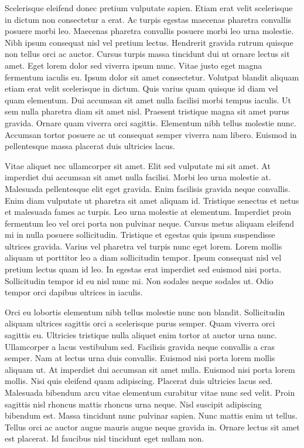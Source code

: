 \documentclass[11pt,a4paper]{article}
\begin{document}
Scelerisque eleifend donec pretium vulputate sapien. Etiam erat velit scelerisque in dictum non consectetur a erat. Ac turpis egestas maecenas pharetra convallis posuere morbi leo. Maecenas pharetra convallis posuere morbi leo urna molestie. Nibh ipsum consequat nisl vel pretium lectus. Hendrerit gravida rutrum quisque non tellus orci ac auctor. Cursus turpis massa tincidunt dui ut ornare lectus sit amet. Eget lorem dolor sed viverra ipsum nunc. Vitae justo eget magna fermentum iaculis eu. Ipsum dolor sit amet consectetur. Volutpat blandit aliquam etiam erat velit scelerisque in dictum. Quis varius quam quisque id diam vel quam elementum. Dui accumsan sit amet nulla facilisi morbi tempus iaculis. Ut sem nulla pharetra diam sit amet nisl. Praesent tristique magna sit amet purus gravida. Ornare quam viverra orci sagittis. Elementum nibh tellus molestie nunc. Accumsan tortor posuere ac ut consequat semper viverra nam libero. Euismod in pellentesque massa placerat duis ultricies lacus.

Vitae aliquet nec ullamcorper sit amet. Elit sed vulputate mi sit amet. At imperdiet dui accumsan sit amet nulla facilisi. Morbi leo urna molestie at. Malesuada pellentesque elit eget gravida. Enim facilisis gravida neque convallis. Enim diam vulputate ut pharetra sit amet aliquam id. Tristique senectus et netus et malesuada fames ac turpis. Leo urna molestie at elementum. Imperdiet proin fermentum leo vel orci porta non pulvinar neque. Cursus metus aliquam eleifend mi in nulla posuere sollicitudin. Tristique et egestas quis ipsum suspendisse ultrices gravida. Varius vel pharetra vel turpis nunc eget lorem. Lorem mollis aliquam ut porttitor leo a diam sollicitudin tempor. Ipsum consequat nisl vel pretium lectus quam id leo. In egestas erat imperdiet sed euismod nisi porta. Sollicitudin tempor id eu nisl nunc mi. Non sodales neque sodales ut. Odio tempor orci dapibus ultrices in iaculis.

Orci eu lobortis elementum nibh tellus molestie nunc non blandit. Sollicitudin aliquam ultrices sagittis orci a scelerisque purus semper. Quam viverra orci sagittis eu. Ultricies tristique nulla aliquet enim tortor at auctor urna nunc. Ullamcorper a lacus vestibulum sed. Facilisis gravida neque convallis a cras semper. Nam at lectus urna duis convallis. Euismod nisi porta lorem mollis aliquam ut. At imperdiet dui accumsan sit amet nulla. Euismod nisi porta lorem mollis. Nisi quis eleifend quam adipiscing. Placerat duis ultricies lacus sed. Malesuada bibendum arcu vitae elementum curabitur vitae nunc sed velit. Proin sagittis nisl rhoncus mattis rhoncus urna neque. Nisl suscipit adipiscing bibendum est. Massa tincidunt nunc pulvinar sapien. Nunc mattis enim ut tellus. Tellus orci ac auctor augue mauris augue neque gravida in. Ornare lectus sit amet est placerat. Id faucibus nisl tincidunt eget nullam non.
\end{document}
